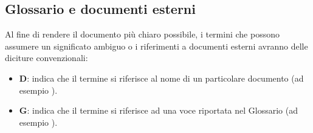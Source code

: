 \subsection{Glossario e documenti esterni}\label{GlossarioDocumentiEsterni}
Al fine di rendere il documento più chiaro possibile, i termini che possono assumere un significato ambiguo o i riferimenti a documenti esterni
avranno delle diciture convenzionali:

\begin{itemize}
    \item \textbf{D}: indica che il termine si riferisce al nome di un particolare documento (ad esempio \PdPd).
    \item \textbf{G}: indica che il termine si riferisce ad una voce riportata nel Glossario (ad esempio ).
\end{itemize}
